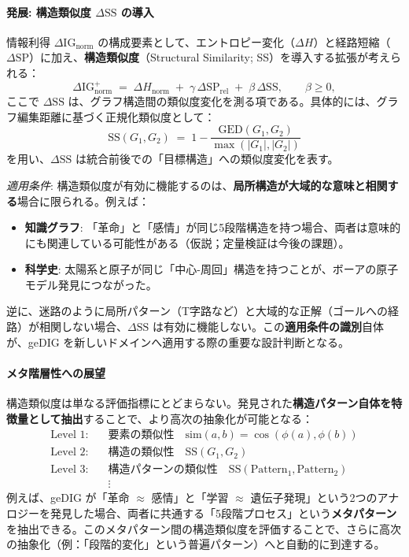 \documentclass[ja=standard,xelatex]{bxjsarticle}
\newcommand{\ignorm}{\Delta\mathrm{IG}_{\mathrm{norm}}}
\begin{document}
\paragraph{発展: 構造類似度 $\Delta\mathrm{SS}$ の導入}\label{sec:structural_similarity_extension}
情報利得 $\ignorm$ の構成要素として、エントロピー変化（$\Delta H$）と経路短縮（$\Delta\mathrm{SP}$）に加え、\textbf{構造類似度}（Structural Similarity; SS）を導入する拡張が考えられる：
\begin{equation}
\ignorm^{+}\;=\;\Delta H_{\mathrm{norm}}\; +\; \gamma\,\Delta \mathrm{SP}_{\mathrm{rel}}\; +\; \beta\,\Delta \mathrm{SS},\qquad \beta\ge 0,\label{eq:ignorm_extended}
\end{equation}
ここで $\Delta\mathrm{SS}$ は、グラフ構造間の類似度変化を測る項である。具体的には、グラフ編集距離に基づく正規化類似度として：
\begin{equation}
\mathrm{SS}(G_1, G_2)\;=\;1 - \frac{\mathrm{GED}(G_1, G_2)}{\max(|G_1|, |G_2|)}
\end{equation}
を用い、$\Delta\mathrm{SS}$ は統合前後での「目標構造」への類似度変化を表す。

\noindent\textit{適用条件}: 構造類似度が有効に機能するのは、\textbf{局所構造が大域的な意味と相関する}場合に限られる。例えば：
\begin{itemize}[leftmargin=1.6em]
  \item \textbf{知識グラフ}: 「革命」と「感情」が同じ5段階構造を持つ場合、両者は意味的にも関連している可能性がある（仮説；定量検証は今後の課題）。
  \item \textbf{科学史}: 太陽系と原子が同じ「中心-周回」構造を持つことが、ボーアの原子モデル発見につながった。
\end{itemize}
逆に、迷路のように局所パターン（T字路など）と大域的な正解（ゴールへの経路）が相関しない場合、$\Delta\mathrm{SS}$ は有効に機能しない。この\textbf{適用条件の識別}自体が、geDIG を新しいドメインへ適用する際の重要な設計判断となる。

\paragraph{メタ階層性への展望}\label{sec:meta_hierarchy}
構造類似度は単なる評価指標にとどまらない。発見された\textbf{構造パターン自体を特徴量として抽出}することで、より高次の抽象化が可能となる：
\begin{align*}
\text{Level 1:} \quad & \text{要素の類似性} \quad \mathrm{sim}(a, b) = \cos(\phi(a), \phi(b)) \\
\text{Level 2:} \quad & \text{構造の類似性} \quad \mathrm{SS}(G_1, G_2) \\
\text{Level 3:} \quad & \text{構造パターンの類似性} \quad \mathrm{SS}(\mathrm{Pattern}_1, \mathrm{Pattern}_2) \\
& \vdots
\end{align*}
例えば、geDIG が「革命 $\approx$ 感情」と「学習 $\approx$ 遺伝子発現」という2つのアナロジーを発見した場合、両者に共通する「5段階プロセス」という\textbf{メタパターン}を抽出できる。このメタパターン間の構造類似度を評価することで、さらに高次の抽象化（例：「段階的変化」という普遍パターン）へと自動的に到達する。
\end{document}
